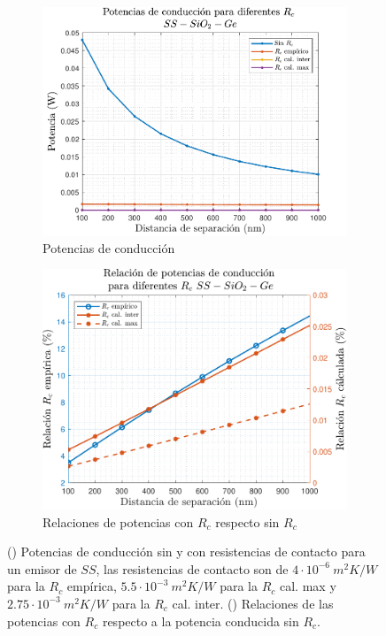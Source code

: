 \begin{figure}[H]
	\centering
	\begin{subfigure}[b]{0.49\textwidth}
		\centering
			\includegraphics[width=1.00\textwidth]{figuras/Resultados/conduccion/pdf/Prcs_SsSiO2Ge.pdf}
		\caption{Potencias de conducción}
		\label{fig:Prcs_SsSiO2Ge}
	\end{subfigure}
	\hfill
	\begin{subfigure}[b]{0.49\textwidth}
		\centering
			\includegraphics[width=1.00\textwidth]{figuras/Resultados/conduccion/pdf/relPrcs_SsSiO2Ge.pdf}
		\caption{Relaciones de potencias con $R_c$ respecto sin $R_c$}
		\label{fig:relPrcs_SsSiO2Ge}
	\end{subfigure}
	\caption{ () Potencias de conducción sin y con resistencias de contacto para un emisor de $SS$, las resistencias de contacto son de $4\cdot 10^{-6} \ m^2 K/W$ para la $R_c$ empírica, $5.5\cdot 10^{-3} \ m^2 K/W$ para la $R_c$ cal. max y $2.75\cdot 10^{-3} \ m^2 K/W$ para la $R_c$ cal. inter. () Relaciones de las potencias con $R_c$ respecto a la potencia conducida sin $R_c$.}
	\label{fig:Pcond_SsSiO2Ge}
\end{figure}
